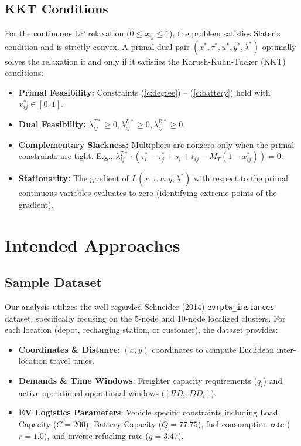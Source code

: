 \documentclass[11pt]{article}
\begin{document}
\subsection{KKT Conditions}
For the continuous LP relaxation ($0 \le x_{ij} \le 1$), the problem satisfies Slater's condition and is strictly convex. A primal-dual pair $(x^*, \tau^*, u^*, y^*, \lambda^*)$ optimally solves the relaxation if and only if it satisfies the Karush-Kuhn-Tucker (KKT) conditions:
\begin{itemize}
    \item \textbf{Primal Feasibility:} Constraints (\ref{c:degree}) -- (\ref{c:battery}) hold with $x_{ij}^* \in [0,1]$.
    \item \textbf{Dual Feasibility:} $\lambda^{T*}_{ij} \ge 0, \lambda^{L*}_{ij} \ge 0, \lambda^{B*}_{ij} \ge 0$.
    \item \textbf{Complementary Slackness:} Multipliers are nonzero only when the primal constraints are tight. E.g., $\lambda^{T*}_{ij} \cdot (\tau_i^* - \tau_j^* + s_i + t_{ij} - M_T(1 - x_{ij}^*)) = 0$.
    \item \textbf{Stationarity:} The gradient of $L(x, \tau, u, y, \lambda^*)$ with respect to the primal continuous variables evaluates to zero (identifying extreme points of the gradient).
\end{itemize}

\section{Intended Approaches}

\subsection{Sample Dataset}
Our analysis utilizes the well-regarded Schneider (2014) \texttt{evrptw\_instances} dataset, specifically focusing on the 5-node and 10-node localized clusters. For each location (depot, recharging station, or customer), the dataset provides:
\begin{itemize}
    \item \textbf{Coordinates \& Distance}: $(x, y)$ coordinates to compute Euclidean inter-location travel times.
    \item \textbf{Demands \& Time Windows}: Freighter capacity requirements ($q_i$) and active operational operational windows ($[RD_i, DD_i]$).
    \item \textbf{EV Logistics Parameters}: Vehicle specific constraints including Load Capacity ($C=200$), Battery Capacity ($Q=77.75$), fuel consumption rate ($r=1.0$), and inverse refueling rate ($g=3.47$).
\end{itemize}
\end{document}
